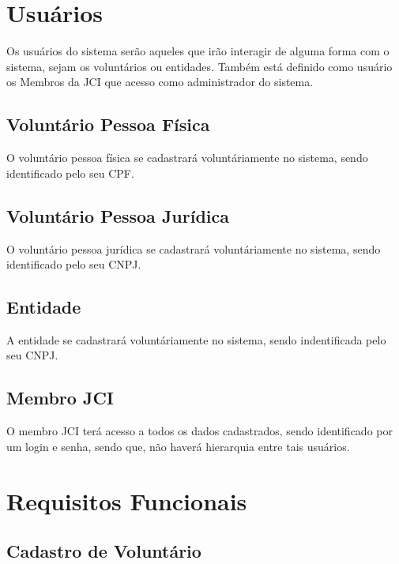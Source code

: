   \section{Usuários}
  Os usuários do sistema serão aqueles que irão interagir de alguma forma com o sistema, sejam os voluntários ou entidades. Também está definido como usuário os Membros da JCI que acesso como administrador do sistema.

   \subsection{Voluntário Pessoa Física}
   O voluntário pessoa física se cadastrará voluntáriamente no sistema, sendo identificado pelo seu CPF.
   \subsection{Voluntário Pessoa Jurídica}
   O voluntário pessoa jurídica se cadastrará voluntáriamente no sistema, sendo identificado pelo seu CNPJ.
   \subsection{Entidade}
   A entidade se cadastrará voluntáriamente no sistema, sendo indentificada pelo seu CNPJ.
   \subsection{Membro JCI}
   O membro JCI terá acesso a todos os dados cadastrados, sendo identificado por um login e senha, sendo que, não haverá hierarquia entre tais usuários. 

  \section{Requisitos Funcionais}
    \subsection{Cadastro de Voluntário}
